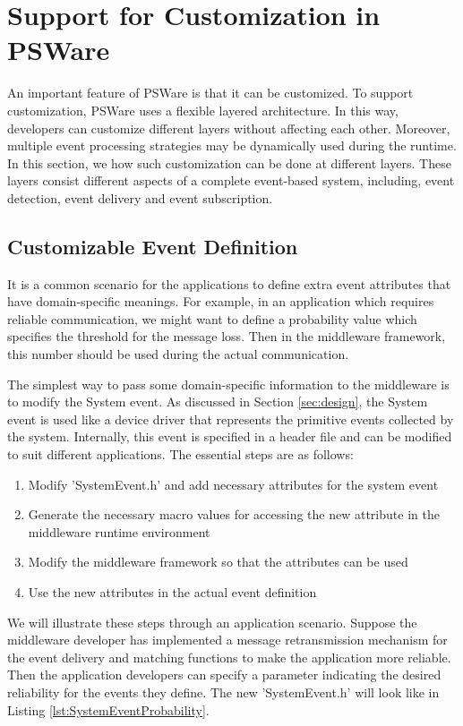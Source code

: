 \section{Support for Customization in PSWare}
\label{sec:flexibility}
An important feature of PSWare is that it can be customized. To support customization, PSWare uses a flexible layered architecture. In this way, developers can customize different layers without affecting each other. Moreover, multiple event processing strategies may be dynamically used during the runtime. In this section, we how such customization can be done at different layers. These layers consist different aspects of a complete event-based system, including, event detection, event delivery and event subscription.

\subsection{Customizable Event Definition}
It is a common scenario for the applications to define extra event attributes that have domain-specific meanings. For example, in an application which requires reliable communication, we might want to define a probability value which specifies the threshold for the message loss. Then in the middleware framework, this number should be used during the actual communication.

The simplest way to pass some domain-specific information to the middleware is to modify the System event. As discussed in Section \ref{sec:design}, the System event is used like a device driver that represents the primitive events collected by the system. Internally, this event is specified in a header file and can be modified to suit different applications. The essential steps are as follows:
\begin{enumerate}
\item Modify 'SystemEvent.h' and add necessary attributes for the system event
\item Generate the necessary macro values for accessing the new attribute in the middleware runtime environment
\item Modify the middleware framework so that the attributes can be used
\item Use the new attributes in the actual event definition
\end{enumerate}

We will illustrate these steps through an application scenario. Suppose the middleware developer has implemented a message retransmission mechanism for the event delivery and matching functions to make the application more reliable. Then the application developers can specify a parameter indicating the desired reliability for the events they define. The new 'SystemEvent.h' will look like in Listing \ref{lst:SystemEventProbability}.

